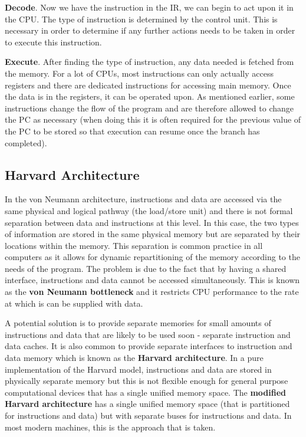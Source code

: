 \documentclass{article}
\begin{document}
	\par 
	\textbf{Decode}. Now we have the instruction in the IR, we can begin to act upon it in the CPU. The type of instruction is determined by the control unit. This is necessary in order to determine if any further actions needs to be taken in order to execute this instruction.
	
	\par 
	\textbf{Execute}. After finding the type of instruction, any data needed is fetched from the memory. For a lot of CPUs, most instructions can only actually access registers and there are dedicated instructions for accessing main memory. Once the data is in the registers, it can be operated upon. As mentioned earlier, some instructions change the flow of the program and are therefore allowed to change the PC as necessary (when doing this it is often required for the previous value of the PC to be stored so that execution can resume once the branch has completed).
	
	\subsection{Harvard Architecture}
	In the von Neumann architecture, instructions and data are accessed via the same physical and logical pathway (the load/store unit) and there is not formal separation between data and instructions at this level. In this case, the two types of information are stored in the same physical memory but are separated by their locations within the memory. This separation is common practice in all computers as it allows for dynamic repartitioning of the memory according to the needs of the program. The problem is due to the fact that by having a shared interface, instructions and data cannot be accessed simultaneously. This is known as the \textbf{von Neumann bottleneck} and it restricts CPU performance to the rate at which is can be supplied with data.
	
	\par 
	A potential solution is to provide separate memories for small amounts of instructions and data that are likely to be used soon - separate instruction and data caches. It is also common to provide separate interfaces to instruction and data memory which is known as the \textbf{Harvard architecture}. In a pure implementation of the Harvard model, instructions and data are stored in physically separate memory but this is not flexible enough for general purpose computational devices that has a single unified memory space. The \textbf{modified Harvard architecture} has a single unified memory space (that is partitioned for instructions and data) but with separate buses for instructions and data. In most modern machines, this is the approach that is taken.
	
\end{document}
